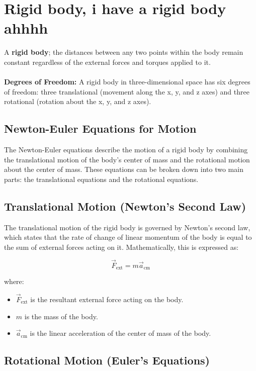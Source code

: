\section{Rigid body, i have a rigid body ahhhh}
A \textbf{rigid body}; the distances between any two points within the body remain constant regardless of the external forces and torques applied to it.
\\
\\
\textbf{Degrees of Freedom:} A rigid body in three-dimensional space has six degrees of freedom: three translational (movement along the x, y, and z axes) and three rotational (rotation about the x, y, and z axes).

\subsection{Newton-Euler Equations for Motion}

The Newton-Euler equations describe the motion of a rigid body by combining the translational motion of the body's center of mass and the rotational motion about the center of mass. These equations can be broken down into two main parts: the translational equations and the rotational equations.

\subsection{Translational Motion (Newton's Second Law)}

The translational motion of the rigid body is governed by Newton's second law, which states that the rate of change of linear momentum of the body is equal to the sum of external forces acting on it. Mathematically, this is expressed as:

\[
\vec{F}_{\text{ext}} = m \vec{a}_{\text{cm}}
\]

where:
\begin{itemize}
    \item \( \vec{F}_{\text{ext}} \) is the resultant external force acting on the body.
    \item \( m \) is the mass of the body.
    \item \( \vec{a}_{\text{cm}} \) is the linear acceleration of the center of mass of the body.
\end{itemize}

\subsection{Rotational Motion (Euler's Equations)}

